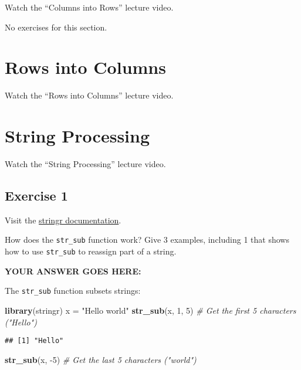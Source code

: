 \documentclass[
]{article}
\newenvironment{Shaded}{\begin{snugshade}}{\end{snugshade}}
\newcommand{\CommentTok}[1]{\textcolor[rgb]{0.56,0.35,0.01}{\textit{#1}}}
\newcommand{\DecValTok}[1]{\textcolor[rgb]{0.00,0.00,0.81}{#1}}
\newcommand{\KeywordTok}[1]{\textcolor[rgb]{0.13,0.29,0.53}{\textbf{#1}}}
\newcommand{\NormalTok}[1]{#1}
\newcommand{\StringTok}[1]{\textcolor[rgb]{0.31,0.60,0.02}{#1}}
\begin{document}
Watch the ``Columns into Rows'' lecture video.

No exercises for this section.

\hypertarget{rows-into-columns}{%
\section{Rows into Columns}\label{rows-into-columns}}

Watch the ``Rows into Columns'' lecture video.

\hypertarget{string-processing}{%
\section{String Processing}\label{string-processing}}

Watch the ``String Processing'' lecture video.

\hypertarget{exercise-1}{%
\subsection{Exercise 1}\label{exercise-1}}

Visit the \href{https://stringr.tidyverse.org/}{stringr documentation}.

How does the \texttt{str\_sub} function work? Give 3 examples, including
1 that shows how to use \texttt{str\_sub} to reassign part of a string.

\textbf{YOUR ANSWER GOES HERE:}

The \texttt{str\_sub} function subsets strings:

\begin{Shaded}
\begin{Highlighting}[]
\KeywordTok{library}\NormalTok{(stringr)}
\NormalTok{x =}\StringTok{ "Hello world"}
\KeywordTok{str\_sub}\NormalTok{(x, }\DecValTok{1}\NormalTok{, }\DecValTok{5}\NormalTok{)  }\CommentTok{\# Get the first 5 characters ("Hello")}
\end{Highlighting}
\end{Shaded}

\begin{verbatim}
## [1] "Hello"
\end{verbatim}

\begin{Shaded}
\begin{Highlighting}[]
\KeywordTok{str\_sub}\NormalTok{(x, }\DecValTok{{-}5}\NormalTok{) }\CommentTok{\# Get the last 5 characters ("world")}
\end{Highlighting}
\end{Shaded}
\end{document}
